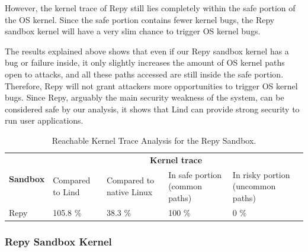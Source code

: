 However, the kernel trace of Repy still lies completely within the safe
portion of the OS kernel. 
Since the safe portion contains fewer kernel bugs, the Repy sandbox kernel
will have a very slim chance to trigger OS kernel bugs.

The results explained above shows that even if our Repy sandbox kernel has a
bug or failure inside, 
it only slightly increases the amount of OS kernel paths open to attacks,
and all these paths accessed are still inside the safe portion. 
Therefore, Repy will not grant attackers more opportunities to trigger OS
kernel bugs. 
Since Repy, arguably the main security weakness of the system, can be
considered safe by our analysis, 
it shows that Lind can provide strong security to run user applications.

\begin{table}
\centering
\scriptsize
\caption{Reachable Kernel Trace Analysis for the Repy Sandbox. }
\begin{tabular}{|l|l|l|l|l|}
  \hline
  \multirow{3}{.8cm}{\bf Sandbox} & \multicolumn{4}{c|}{\bf Kernel trace} \\ \cline{2-5}
  & \multirow{2}{1cm}{Compared to Lind} & 
  \multirow{2}{1.3cm}{Compared to native Linux} & \multirow{2}{1.7cm}{In safe portion 
  (common paths)} & \multirow{2}{1.9cm}{In risky portion (uncommon paths)} \\
  & & & & \\  \hline
  
  Repy & 105.8 \% & 38.3 \% & 100 \%  & 0 \%  \\
  \hline
\end{tabular}
\label{table:trace-Repy}
\end{table}


\subsubsection{Repy Sandbox Kernel}
\label{Sandbox-Kernel-Bugs}

